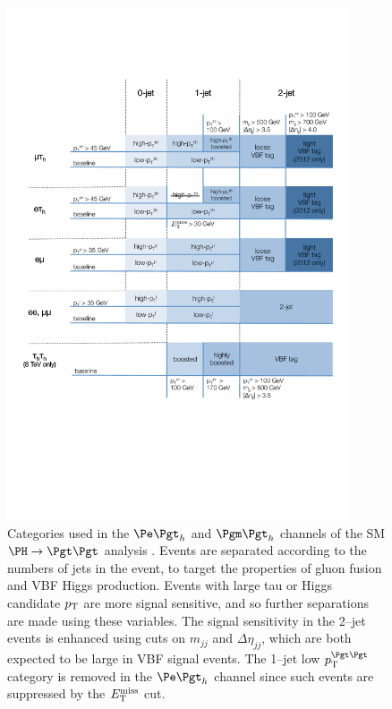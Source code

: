 \begin{figure}[htb]
\begin{center}
    \includegraphics[width=0.9\textwidth]
      {plots/htt-sm/categories_2012.pdf}
\end{center}
\caption[Categories used in the $\etau$ and $\mutau$ channels of the SM
 $\HToTauTau$ analysis.]{
 Categories used in the $\etau$ and $\mutau$ channels of the \ac{SM}
 $\HToTauTau$ analysis \cite{HIG-13-004}. Events are separated according to the
 numbers of jets in the event, to target the properties of gluon fusion and \ac{VBF}
 Higgs production. Events with large tau or Higgs candidate $p_{\mathrm{T}}$ are more
 signal sensitive, and so further separations are made using these variables.
 The signal sensitivity in the 2--jet events is enhanced using cuts on $m_{jj}$ and
 $\Delta\eta_{jj}$, which are both expected to be large in \ac{VBF} signal events.
 The 1--jet low $\pt^{\Pgt\Pgt}$ category is removed in the $\etau$ channel
 since such events are suppressed by the $E_{\mathrm{T}}^{\text{miss}}$ cut.   
}
\label{fig:smcategories}
\end{figure}

